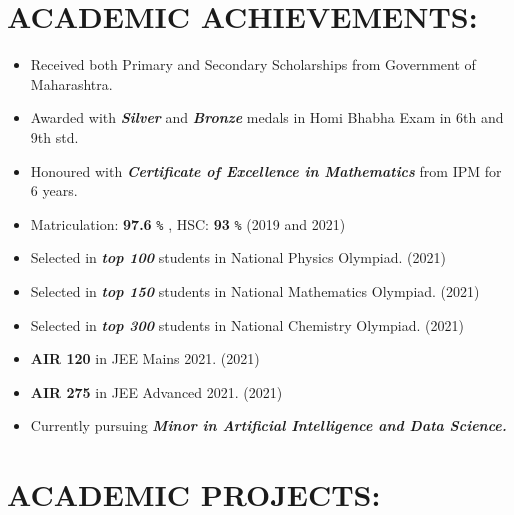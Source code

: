 \documentclass{article}
\begin{document}
\section*{\color{blue!60!black}ACADEMIC ACHIEVEMENTS:}

\begin{itemize}
    \item Received both Primary and Secondary Scholarships from Government of Maharashtra.
    \item Awarded with \textit{\textbf{Silver}} and \textit{\textbf{Bronze}} medals in Homi Bhabha Exam in 6th and 9th std.
    \item Honoured with \textbf{\textit{Certificate of Excellence in Mathematics}} from IPM for 6 years.
    \item Matriculation: \textbf{97.6} \verb!%! , HSC: \textbf{93} \verb!%! \hfill{(2019 and 2021)}
    \item Selected in \textbf{\textit{top 100}} students in National Physics Olympiad.  \hfill{(2021)}
    \item Selected in \textbf{\textit{top 150}} students in National Mathematics Olympiad.  \hfill{(2021)}
    \item Selected in \textbf{\textit{top 300}} students in National Chemistry Olympiad.  \hfill{(2021)}
    \item \textbf{AIR 120} in JEE Mains 2021. \hfill{(2021)}
    \item \textbf{AIR 275} in JEE Advanced 2021. \hfill{(2021)}
    \item Currently pursuing \textbf{\textit{Minor in Artificial Intelligence and Data Science.}}
\end{itemize}


\section*{\color{blue!60!black}ACADEMIC PROJECTS:}
\end{document}
